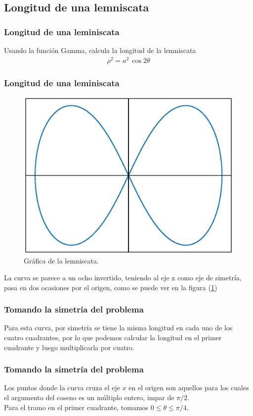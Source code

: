 \documentclass[12pt]{beamer}
\begin{document}
\subsection{Longitud de una lemniscata}
\begin{frame}
\frametitle{Longitud de una leminiscata}
Usando la función Gamma, calcula la longitud de la lemniscata
\begin{align*}
\rho^{2} = a^{2} \, \cos 2 \theta
\end{align*}
\end{frame}
\begin{frame}
\frametitle{Longitud de una leminiscata}
\begin{figure}
    \centering
    \includegraphics[scale=0.35]{Imagenes/plot_leminscata_01.eps}
    \caption{Gráfica de la lemniscata.}
    \label{fig:figura_lemniscata}
\end{figure}
La curva se parece a un ocho invertido, teniendo al eje x como eje de simetría, pasa en dos ocasiones por el origen, como se puede ver en la figura (\ref{fig:figura_lemniscata})
\end{frame}
\begin{frame}
\frametitle{Tomando la simetría del problema}
Para esta curva, por simetría se tiene la misma longitud en cada uno de los cuatro cuadrantes, por lo que podemos calcular la longitud en el primer cuadrante y luego multiplicarla por cuatro.
\end{frame}
\begin{frame}
\frametitle{Tomando la simetría del problema}
Los puntos donde la curva cruza el eje $x$ en el origen son aquellos para los cuales el argumento del coseno es un múltiplo entero, impar de $\pi / 2$. 
\\
\bigskip
Para el tramo en el primer cuadrante, tomamos $0 \leq \theta \leq \pi/4$.
\end{frame}
\end{document}
